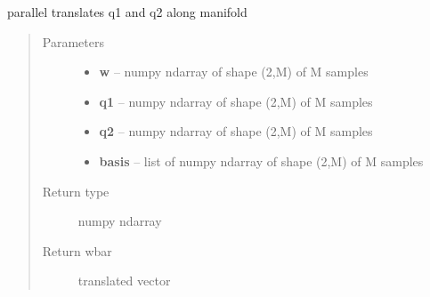 \documentclass[letterpaper,10pt,english]{sphinxmanual}
\begin{document}
\begin{fulllineitems}
\label{geodesic:geodesic.parallel_translate}
parallel translates q1 and q2 along manifold
\begin{quote}\begin{description}
\item[{Parameters}] \leavevmode\begin{itemize}
\item {} 
\textbf{w} -- numpy ndarray of shape (2,M) of M samples

\item {} 
\textbf{q1} -- numpy ndarray of shape (2,M) of M samples

\item {} 
\textbf{q2} -- numpy ndarray of shape (2,M) of M samples

\item {} 
\textbf{basis} -- list of numpy ndarray of shape (2,M) of M samples

\end{itemize}

\item[{Return type}] \leavevmode
numpy ndarray

\item[{Return wbar}] \leavevmode
translated vector

\end{description}\end{quote}

\end{fulllineitems}

\end{document}
